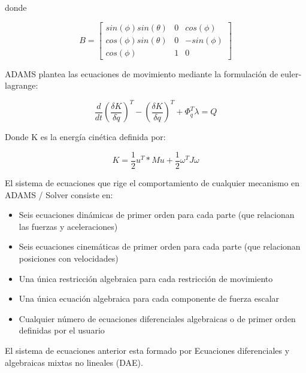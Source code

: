         donde
        
        \begin{equation}
            B=\begin{bmatrix}
                sin(\phi)sin(\theta) & 0 & cos(\phi)\\
                cos(\phi)sin(\theta) & 0 & -sin(\phi)\\
                cos(\phi) & 1 & 0
            \end{bmatrix}
        \end{equation}
        
        
        ADAMS plantea las ecuaciones de movimiento mediante la formulación de euler-lagrange:
        
        \begin{equation}
             \frac{d}{dt} \left( \frac{ \delta K}{ \delta \dot{q}} \right)^T - \left( \frac{ \delta K}{ \delta q} \right)^T + \Phi_{q}^T\lambda = Q
             \label{eq:cap4_dina_ma_1}
        \end{equation}
        
        Donde K es la energía cinética definida por:
        
        \begin{equation}
            K = \frac{1}{2}u^T*Mu+\frac{1}{2}\omega^TJ\omega
        \end{equation}
        
        
        El sistema de ecuaciones que rige el comportamiento de cualquier mecanismo en ADAMS / Solver consiste en:
        
        \begin{itemize}
            \item Seis ecuaciones dinámicas de primer orden para cada parte (que relacionan las fuerzas y aceleraciones)
            \item Seis ecuaciones cinemáticas de primer orden para cada parte (que relacionan posiciones con velocidades)
            \item Una única restricción algebraica para cada restricción de movimiento
            \item Una única ecuación algebraica para cada componente de fuerza escalar
            \item Cualquier número de ecuaciones diferenciales algebraicas o de primer orden definidas por el usuario 
        \end{itemize}
        
        El sistema de ecuaciones anterior esta formado por  Ecuaciones diferenciales y algebraicas mixtas no lineales (DAE).

